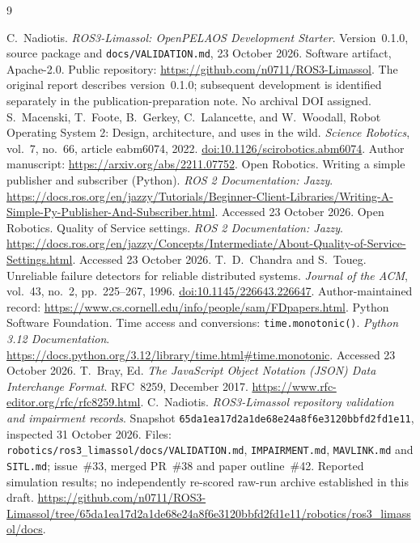 \documentclass[11pt,a4paper]{article}
\newcommand{\code}[1]{\texttt{#1}}
\begin{document}
\begin{thebibliography}{9}\small\raggedright
{}
\setlength{\itemsep}{3pt}
C.~Nadiotis. \emph{ROS3-Limassol: OpenPELAOS Development Starter}.
Version~0.1.0, source package and \code{docs/VALIDATION.md}, 23 October 2026.
Software artifact, Apache-2.0. Public repository:
\url{https://github.com/n0711/ROS3-Limassol}.
The original report describes version~0.1.0; subsequent development is identified
separately in the publication-preparation note. No archival DOI assigned.
S.~Macenski, T.~Foote, B.~Gerkey, C.~Lalancette, and W.~Woodall,
Robot Operating System 2: Design, architecture, and uses in the wild.
\emph{Science Robotics}, vol.~7, no.~66, article eabm6074, 2022.
\href{https://doi.org/10.1126/scirobotics.abm6074}{doi:10.1126/scirobotics.abm6074}.
Author manuscript: \url{https://arxiv.org/abs/2211.07752}.
Open Robotics. Writing a simple publisher and subscriber (Python).
\emph{ROS 2 Documentation: Jazzy}.
\url{https://docs.ros.org/en/jazzy/Tutorials/Beginner-Client-Libraries/Writing-A-Simple-Py-Publisher-And-Subscriber.html}.
Accessed 23 October 2026.
Open Robotics. Quality of Service settings. \emph{ROS 2 Documentation: Jazzy}.
\url{https://docs.ros.org/en/jazzy/Concepts/Intermediate/About-Quality-of-Service-Settings.html}.
Accessed 23 October 2026.
T.~D.~Chandra and S.~Toueg. Unreliable failure detectors for reliable distributed
systems. \emph{Journal of the ACM}, vol.~43, no.~2, pp.~225--267, 1996.
\href{https://doi.org/10.1145/226643.226647}{doi:10.1145/226643.226647}.
Author-maintained record: \url{https://www.cs.cornell.edu/info/people/sam/FDpapers.html}.
Python Software Foundation. Time access and conversions:
\code{time.monotonic()}. \emph{Python 3.12 Documentation}.
\url{https://docs.python.org/3.12/library/time.html#time.monotonic}.
Accessed 23 October 2026.
T.~Bray, Ed. \emph{The JavaScript Object Notation (JSON) Data Interchange Format}.
RFC~8259, December 2017.
\url{https://www.rfc-editor.org/rfc/rfc8259.html}.
C.~Nadiotis. \emph{ROS3-Limassol repository validation and impairment records}.
Snapshot \code{65da1ea17d2a1de68e24a8f6e3120bbfd2fd1e11}, inspected
31 October 2026. Files: \code{robotics/ros3\_limassol/docs/VALIDATION.md},
\code{IMPAIRMENT.md}, \code{MAVLINK.md} and \code{SITL.md}; issue~\#33,
merged PR~\#38 and paper outline~\#42. Reported simulation results;
no independently re-scored raw-run archive established in this draft.
\url{https://github.com/n0711/ROS3-Limassol/tree/65da1ea17d2a1de68e24a8f6e3120bbfd2fd1e11/robotics/ros3_limassol/docs}.
\end{thebibliography}
\end{document}
